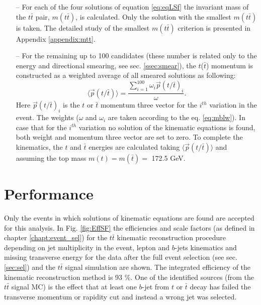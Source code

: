 \begin{itemize}
 \item [--] For each of the four solutions of equation \ref{eq:eqLSf} the invariant mass of the $t\bar{t}$ pair, $m(t\bar{t})$, is calculated. Only
 the solution with the smallest $m(t\bar{t})$ is taken. The detailed study of the smallest $m(t\bar{t})$ criterion is presented in Appendix \ref{appendix:mtt}. 
 \item [--] For the remaining up to 100 candidates (these number is related only to the energy and directional smearing, see sec. \ref{ssec:smear}), the $t$($\bar{t}$) 
 momentum is constructed as a weighted average of all smeared solutions as following:
 \begin{equation}\label{eq:weigh_av}
  \langle{\vec{p}(t/\bar{t})}\rangle = \frac{\sum\limits_{i=1}^{100} \omega_{i} \vec{p}(t/\bar{t})_i}{\omega}.
 \end{equation}
 Here $\vec{p}(t/ \bar{t})_{i}$ is the $t$ or $\bar{t}$ momentum three vector for the $i^{th}$ variation in the event. The weights ($\omega$ and $\omega_{i}$ are taken according 
 to the eq. \ref{eq:mblw}).
 In case that for the $i^{th}$ variation no solution of the kinematic equations is found, both weight and momentum three vector are set to zero. To complete the kinematics,
 the $t$ and $\bar{t}$ energies are calculated taking $\langle{\vec{p}(t/\bar{t})}\rangle$ and assuming the top mass $m(t) = m(\bar{t}) = $ 172.5 GeV.
\end{itemize}

\section{Performance}\label{sec:kinRecPerf}

Only the events in which solutions of kinematic equations are found are accepted for this analysis. 
In Fig. \ref{fig:EffSF} the efficiencies and scale factors (as defined in chapter \ref{chapt:event_sel}) for the $t\bar{t}$ kinematic reconstruction procedure 
depending on jet multiplicity in the event, lepton and $b$-jets kinematics and missing transverse energy for the data after the full event selection
(see sec. \ref{sec:sel}) and the $t\bar{t}$ signal simulation are shown. The integrated efficiency of the kinematic reconstruction method is 93 $\%$. One of
the identified sources (from the $t\bar{t}$ signal MC) is the effect that at least one $b$-jet from $t$ or $\bar{t}$ decay has failed the transverse
momentum or rapidity cut and instead a wrong jet was selected.

